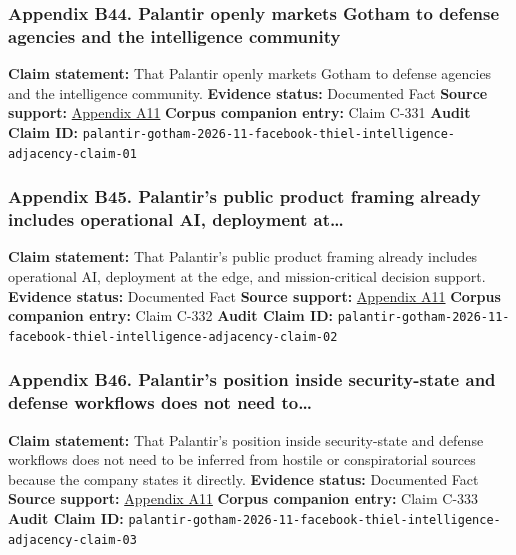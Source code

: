 \documentclass[
  american,
  11pt,
  letterpaper,
]{article}
\begin{document}
\subsubsection{Appendix B44. Palantir openly markets Gotham to defense
agencies and the intelligence
community}\label{appendix-b44-palantir-openly-markets-gotham-to-defense-agencies-and-the-intelligence-community}

\textbf{Claim statement:} That Palantir openly markets Gotham to defense
agencies and the intelligence community. \textbf{Evidence status:}
Documented Fact \textbf{Source support:}
\hyperref[appendix-a11-gotham]{Appendix A11} \textbf{Corpus companion
entry:} Claim C-331 \textbf{Audit Claim ID:}
\texttt{palantir-gotham-2026-11-facebook-thiel-intelligence-adjacency-claim-01}

\subsubsection{Appendix B45. Palantir's public product framing already
includes operational AI, deployment
at\ldots{}}\label{appendix-b45-palantir-s-public-product-framing-already-includes-operational-ai-deployment-at}

\textbf{Claim statement:} That Palantir's public product framing already
includes operational AI, deployment at the edge, and mission-critical
decision support. \textbf{Evidence status:} Documented Fact
\textbf{Source support:} \hyperref[appendix-a11-gotham]{Appendix A11}
\textbf{Corpus companion entry:} Claim C-332 \textbf{Audit Claim ID:}
\texttt{palantir-gotham-2026-11-facebook-thiel-intelligence-adjacency-claim-02}

\subsubsection{Appendix B46. Palantir's position inside security-state
and defense workflows does not need
to\ldots{}}\label{appendix-b46-palantir-s-position-inside-security-state-and-defense-workflows-does-not-need-to}

\textbf{Claim statement:} That Palantir's position inside security-state
and defense workflows does not need to be inferred from hostile or
conspiratorial sources because the company states it directly.
\textbf{Evidence status:} Documented Fact \textbf{Source support:}
\hyperref[appendix-a11-gotham]{Appendix A11} \textbf{Corpus companion
entry:} Claim C-333 \textbf{Audit Claim ID:}
\texttt{palantir-gotham-2026-11-facebook-thiel-intelligence-adjacency-claim-03}
\end{document}
